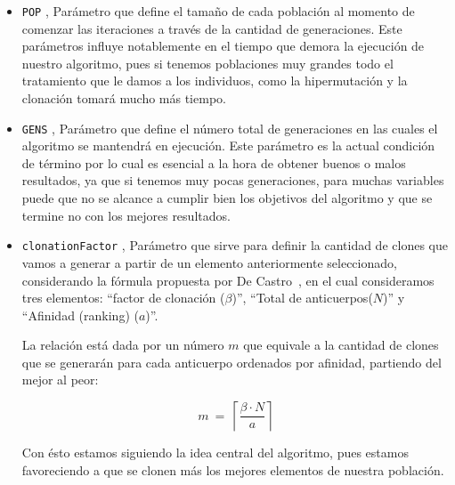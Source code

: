 %

\begin{itemize}
	\item \texttt{POP} \blue{[10,210]}, Parámetro que define el tamaño de cada población al momento de comenzar
			las iteraciones a través de la cantidad de generaciones.
			Este parámetros influye notablemente en el tiempo que demora la ejecución de nuestro algoritmo,
			pues si tenemos poblaciones muy grandes todo el tratamiento que le damos a los individuos,
			como la hipermutación y la clonación tomará mucho más tiempo.

	\item \texttt{GENS} \blue{[10,2000,30]}, Parámetro que define el número total de generaciones en las cuales
			el algoritmo se mantendrá en ejecución. Este parámetro es la actual condición de término
			por lo cual es esencial a la hora de obtener buenos o malos resultados, ya que si tenemos
			muy pocas generaciones, para muchas variables puede que no se alcance a cumplir bien los
			objetivos del algoritmo y que se termine no con los mejores resultados.

	\item \texttt{clonationFactor} \blue{[0,1]} \red{$(\beta)$}, Parámetro que sirve para definir la cantidad de clones
			que vamos a generar a partir de un elemento anteriormente seleccionado, considerando la
			fórmula propuesta por De Castro~\cite{decastro}, en el cual consideramos tres elementos:
			``factor de clonación ($\beta$)'', ``Total de anticuerpos($N$)'' y ``Afinidad (ranking) ($a$)''.
			
			La relación está dada por un número $m$ que equivale a la cantidad de clones que se generarán
            para cada anticuerpo ordenados por afinidad, partiendo del mejor al peor:

            $$m\ =\ \left\lceil\frac{\beta \cdot N}{a}\right\rceil$$

            Con ésto estamos siguiendo la idea central del algoritmo, pues estamos favoreciendo a que se clonen más
            los mejores elementos de nuestra población.


\end{itemize}
